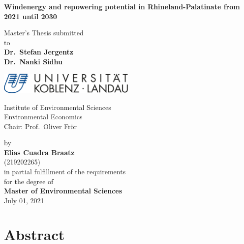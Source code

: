 \documentclass[a4paper,11pt]{article}
\begin{document}
\thispagestyle{empty}
\begin{center}
  \vspace*{5mm}
  \linespread{1.5}
  {\huge{\bf Windenergy and repowering potential in Rhineland-Palatinate from 2021 until 2030}\par}\vspace{1cm}
  Master's Thesis submitted \\\vspace{0.5cm}
  to \\\vspace{0.5cm}
  \textbf{Dr.~Stefan Jergentz} \\
  \textbf{Dr.~Nanki Sidhu} \\\vspace{1.5cm}
  
  
  \includegraphics[width=0.5\textwidth]{Uni-Logo-2.jpg}
  
  Institute of Environmental Sciences \\
  Environmental Economics \\
   Chair: Prof.~Oliver Frör \\  \vspace{1cm}

  
  
  by \\\vspace{0.5cm}
  \textbf{Elias Cuadra Braatz} \\
  (219202265) \\
  
  \medskip
  \medskip
  in partial fulfillment of the requirements \\
  for the degree of \\
  \textbf{Master of Environmental Sciences} \\\vspace{0.5cm}
  July 01, 2021
  
\end{center}


\newpage
\tableofcontents
\clearpage

\newpage
\hypertarget{abstract}{%
\section*{Abstract}\label{abstract}}
\end{document}
